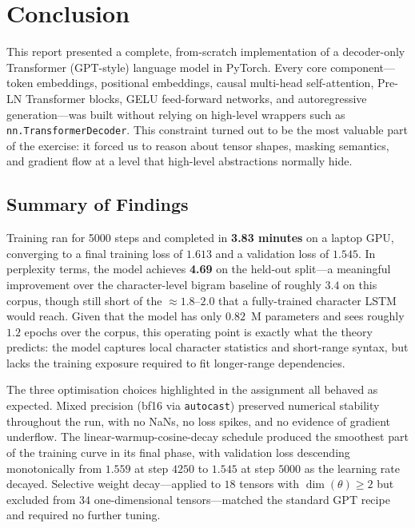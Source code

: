 \section{Conclusion}
\label{sec:conclusion}

This report presented a complete, from-scratch implementation of a
decoder-only Transformer (GPT-style) language model in PyTorch. Every
core component---token embeddings, positional embeddings, causal
multi-head self-attention, Pre-LN Transformer blocks, GELU feed-forward
networks, and autoregressive generation---was built without relying on
high-level wrappers such as \texttt{nn.TransformerDecoder}. This
constraint turned out to be the most valuable part of the exercise: it
forced us to reason about tensor shapes, masking semantics, and gradient
flow at a level that high-level abstractions normally hide.

\subsection{Summary of Findings}
Training ran for 5000 steps and completed in \textbf{3.83 minutes} on a
laptop GPU, converging to a final training loss of $1.613$ and a
validation loss of $1.545$. In perplexity terms, the model achieves
\textbf{4.69} on the held-out split---a meaningful improvement over the
character-level bigram baseline of roughly $3.4$ on this corpus, though
still short of the $\approx 1.8$--$2.0$ that a fully-trained character
LSTM would reach. Given that the model has only $0.82$~M parameters and
sees roughly $1.2$ epochs over the corpus, this operating point is
exactly what the theory predicts: the model captures local character
statistics and short-range syntax, but lacks the training exposure
required to fit longer-range dependencies.

\noindent The three optimisation choices highlighted in the assignment all behaved
as expected. Mixed precision (bf16 via \texttt{autocast}) preserved
numerical stability throughout the run, with no NaNs, no loss spikes,
and no evidence of gradient underflow. The linear-warmup-cosine-decay
schedule produced the smoothest part of the training curve in its final
phase, with validation loss descending monotonically from $1.559$ at
step $4250$ to $1.545$ at step $5000$ as the learning rate decayed.
Selective weight decay---applied to $18$ tensors with
$\dim(\theta) \geq 2$ but excluded from $34$ one-dimensional
tensors---matched the standard GPT recipe and required no further
tuning.

